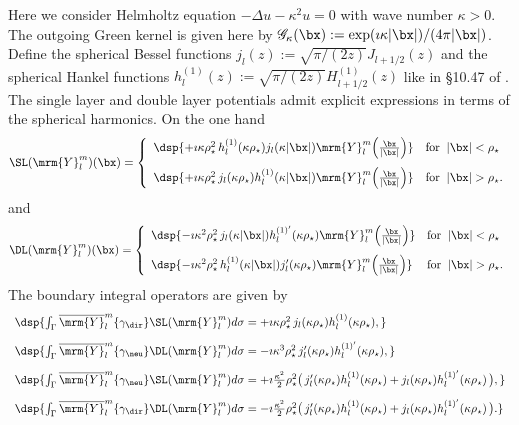 \documentclass[a4paper,11pt]{article}
\begin{document}
Here we consider Helmholtz equation $-\Delta u-\kappa^{2} u =0$ with wave number $\kappa>0$. The outgoing Green kernel 
is given here by $\mathscr{G}_{\kappa}(\bx):=\exp(\imath\kappa\vert\bx\vert)/(4\pi\vert \bx\vert)$.
Define the spherical Bessel functions $j_{l}(z) := \sqrt{\pi/(2z)}J_{l+1/2}(z)$ and the spherical Hankel functions 
$h_{l}^{(1)}(z):= \sqrt{\pi/(2z)}H^{(1)}_{l+1/2}(z)$ like in \S 10.47 of \cite{MR2723248}. 
The single layer and double layer potentials admit explicit expressions in terms of the spherical harmonics. 
On the one hand\\
$$
\SL(\mrm{Y}_{l}^{m})(\bx) =
\left\{\begin{array}{ll}
\dsp{+\imath\kappa\rho_{\star}^{2}\, h^{(1)}_{l}(\kappa\rho_{\star})j_{l}(\kappa\vert \bx\vert)\mrm{Y}_{l}^{m}\Big(\frac{\bx}{\vert\bx\vert}\Big)} & \textrm{for}\;\;\vert \bx\vert<\rho_{\star}\\[10pt]
\dsp{+\imath\kappa\rho_{\star}^{2}\, j_{l}(\kappa\rho_{\star})h^{(1)}_{l}(\kappa\vert \bx\vert)\mrm{Y}_{l}^{m}\Big(\frac{\bx}{\vert\bx\vert}\Big)   } & \textrm{for}\;\;\vert\bx\vert>\rho_{\star}.
\end{array}\right.
$$
and
$$
\DL(\mrm{Y}_{l}^{m})(\bx) =
\left\{\begin{array}{ll}
\dsp{-\imath\kappa^{2}\rho_{\star}^{2}\, j_{l}(\kappa\vert \bx\vert)h^{(1)'}_{l}(\kappa\rho_{\star})\mrm{Y}_{l}^{m}\Big(\frac{\bx}{\vert\bx\vert}\Big) } 
& \textrm{for}\;\;\vert\bx\vert<\rho_{\star}\\[10pt]
\dsp{-\imath\kappa^{2}\rho_{\star}^{2}\, h^{(1)}_{l}(\kappa\vert \bx\vert)j_{l}'(\kappa\rho_{\star})\mrm{Y}_{l}^{m}\Big(\frac{\bx}{\vert\bx\vert}\Big) } 
& \textrm{for}\;\;\vert\bx\vert>\rho_{\star}.
\end{array}\right.
$$
The boundary integral operators are given by
$$
\begin{array}{l}
\dsp{ \int_{\Gamma}\overline{\mrm{Y}}_{l}^{m}\{\gamma_{\dir}\}\SL(\mrm{Y}_{l}^{m}) d\sigma = +\imath\kappa \rho_{\star}^{2}\,j_{l}(\kappa\rho_{\star})h_{l}^{(1)}(\kappa\rho_{\star}), }\\[10pt]
\dsp{ \int_{\Gamma}\overline{\mrm{Y}}_{l}^{m}\{\gamma_{\neu}\}\DL(\mrm{Y}_{l}^{m}) d\sigma = -\imath\kappa^{3}\rho_{\star}^{2} \,j_{l}'(\kappa\rho_{\star})h_{l}^{(1)'}(\kappa\rho_{\star}), }\\[10pt]
\dsp{ \int_{\Gamma}\overline{\mrm{Y}}_{l}^{m}\{\gamma_{\neu}\}\SL(\mrm{Y}_{l}^{m}) d\sigma = +\imath\frac{\kappa^{2}}{2}\rho_{\star}^{2}
\big( \,j_{l}'(\kappa\rho_{\star})h_{l}^{(1)}(\kappa\rho_{\star}) +  j_{l}(\kappa\rho_{\star})h_{l}^{(1)'}(\kappa\rho_{\star})\,\big), }\\[10pt]
\dsp{ \int_{\Gamma}\overline{\mrm{Y}}_{l}^{m}\{\gamma_{\dir}\}\DL(\mrm{Y}_{l}^{m}) d\sigma = -\imath\frac{\kappa^{2}}{2}\rho_{\star}^{2}
\big( \,j_{l}'(\kappa\rho_{\star})h_{l}^{(1)}(\kappa\rho_{\star}) +  j_{l}(\kappa\rho_{\star})h_{l}^{(1)'}(\kappa\rho_{\star})\,\big). }
\end{array}
$$
\end{document}

